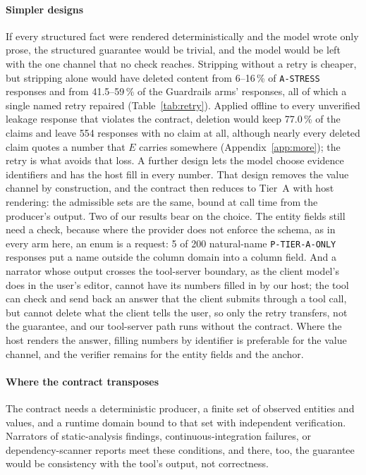 \documentclass[journal]{IEEEtran}
\begin{document}
\paragraph{Simpler designs}
If every structured fact were rendered deterministically and the model wrote
only prose, the structured guarantee would be trivial, and the model would be
left with the one channel that no check reaches. Stripping without a retry is
cheaper, but stripping alone would have deleted content from 6--16\,\% of
\texttt{A-STRESS} responses and from 41.5--59\,\% of the Guardrails arms'
responses, all of which a single named retry repaired (Table~\ref{tab:retry}).
Applied offline to every unverified leakage response that violates the
contract, deletion would keep 77.0\,\% of the claims and leave 554 responses
with no claim at all, although nearly every deleted claim quotes a number that
$E$ carries somewhere (Appendix~\ref{app:more}); the retry is what avoids that
loss.
A further design lets the model choose evidence identifiers and has the host
fill in every number. That design removes the value channel by construction,
and the contract then reduces to Tier~A with host rendering: the admissible
sets are the same, bound at call time from the producer's output. Two of our
results bear on the choice. The entity fields still need a check, because
where the provider does not enforce the schema, as in every arm here, an enum is
a request: 5 of 200 natural-name
\texttt{P-TIER-A-ONLY} responses put a name outside the column domain into a
column field. And a narrator whose output crosses the tool-server boundary, as
the client model's does in the user's editor, cannot have its numbers filled
in by our host; the tool can check and send back an answer that the client
submits through a tool call, but cannot delete what the client tells the user,
so only the retry transfers, not the guarantee, and our tool-server path runs
without the contract. Where the host renders
the answer, filling numbers by identifier is preferable for the value channel,
and the verifier remains for the entity fields and the anchor.


\paragraph{Where the contract transposes}
The contract needs a deterministic producer, a finite set of observed entities
and values, and a runtime domain bound to that set with independent
verification. Narrators of static-analysis findings, continuous-integration
failures, or dependency-scanner reports meet these conditions, and there, too,
the guarantee would be consistency with the tool's output, not correctness.
\end{document}
